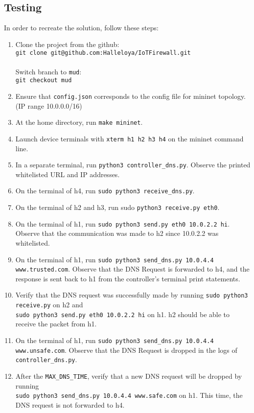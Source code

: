 \subsection{Testing}
In order to recreate the solution, follow these steps:

\begin{enumerate}
    \item Clone the project from the github:  \\
    \verb|git clone git@github.com:Halleloya/IoTFirewall.git| \\
    \\
    Switch branch to \verb|mud|:\\
     \verb|git checkout mud|

     \item Ensure that \verb|config.json| corresponds to the config file for mininet topology. (IP range 10.0.0.0/16)
    \item At the home directory, run \verb|make mininet|.
    \item 
    Launch device terminals with \verb|xterm h1 h2 h3 h4| on the mininet command line.
    \item  In a separate terminal, run \verb|python3 controller_dns.py|. Observe the printed whitelisted URL and IP addresses.
    \item On the terminal of h4, run \verb|sudo python3 receive_dns.py|.
    \item On the terminal of h2 and h3, run sudo \verb|python3 receive.py eth0|.
    \item On the terminal of h1, run \verb|sudo python3 send.py eth0 10.0.2.2 hi|. Observe that the communication was made to h2 since 10.0.2.2 was whitelisted.
    \item
    On the terminal of h1, run \verb|sudo python3 send_dns.py 10.0.4.4 www.trusted.com|. Observe that the DNS Request is forwarded to h4, and the response is sent back to h1 from the controller's terminal print statements.
    \item Verify that the DNS request was successfully made by running \verb|sudo python3 receive.py| on h2 and \\\verb|sudo python3 send.py eth0 10.0.2.2 hi| on h1. h2 should be able to receive the packet from h1.
    \item
    On the terminal of h1, run \verb|sudo python3 send_dns.py 10.0.4.4 www.unsafe.com|. Observe that the DNS Request is dropped in the logs of \verb|controller_dns.py|.
    \item
    After the \verb|MAX_DNS_TIME|, verify that a new DNS request will be dropped by running \\ \verb|sudo python3 send_dns.py 10.0.4.4 www.safe.com| on h1. This time, the DNS request is not forwarded to h4.
    
\end{enumerate}

